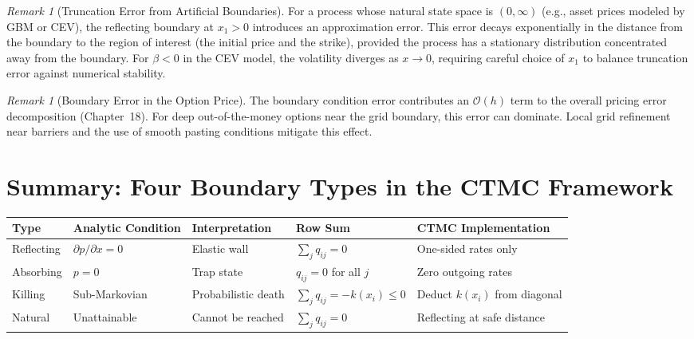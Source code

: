 \documentclass[11pt,a4paper,openany]{book}
\theoremstyle{definition}
\theoremstyle{plain}
\theoremstyle{remark}
\newtheorem{remark}[theorem]{Remark}
\newcommand{\1}{\mathbbm{1}}
\begin{document}
\begin{remark}[Truncation Error from Artificial Boundaries]
For a process whose natural state space is $(0, \infty)$ (e.g., asset prices modeled by GBM or CEV), the reflecting boundary at $x_{1} > 0$ introduces an approximation error. This error decays exponentially in the distance from the boundary to the region of interest (the initial price and the strike), provided the process has a stationary distribution concentrated away from the boundary. For $\beta < 0$ in the CEV model, the volatility diverges as $x \to 0$, requiring careful choice of $x_{1}$ to balance truncation error against numerical stability.
\end{remark}

\begin{remark}[Boundary Error in the Option Price]
The boundary condition error contributes an $\mathcal{O}(h)$ term to the overall pricing error decomposition (Chapter~18). For deep out-of-the-money options near the grid boundary, this error can dominate. Local grid refinement near barriers and the use of smooth pasting conditions mitigate this effect.
\end{remark}

\section{Summary: Four Boundary Types in the CTMC Framework}

\begin{center}
\begin{tabular}{>{\raggedright\arraybackslash}p{2.2cm}>{\raggedright\arraybackslash}p{2.8cm}>{\raggedright\arraybackslash}p{2.5cm}>{\raggedright\arraybackslash}p{2cm}>{\raggedright\arraybackslash}p{2.5cm}}
\toprule
\textbf{Type} & \textbf{Analytic Condition} & \textbf{Interpretation} & \textbf{Row Sum} & \textbf{CTMC Implementation} \\
\midrule
Reflecting & $\partial p/\partial x = 0$ & Elastic wall & $\sum_{j} q_{ij} = 0$ & One-sided rates only \\
Absorbing & $p = 0$ & Trap state & $q_{ij} = 0$ for all $j$ & Zero outgoing rates \\
Killing & Sub-Markovian & Probabilistic death & $\sum_{j} q_{ij} = -k(x_{i}) \leq 0$ & Deduct $k(x_{i})$ from diagonal \\
Natural & Unattainable & Cannot be reached & $\sum_{j} q_{ij} = 0$ & Reflecting at safe distance \\
\bottomrule
\end{tabular}
\end{center}
\end{document}
